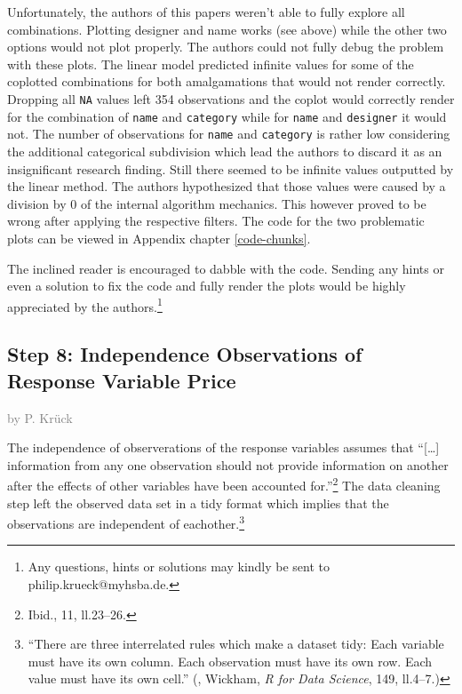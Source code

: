 \documentclass[a4paper, nobind]{templates/ociamthesis}
\begin{document}
Unfortunately, the authors of this papers weren't able to fully explore all combinations.
Plotting designer and name works (see above) while the other two options would not plot properly.
The authors could not fully debug the problem with these plots.
The linear model predicted infinite values for some of the coplotted combinations for both amalgamations that would not render correctly.
Dropping all \texttt{NA} values left 354 observations and the coplot would correctly render for the combination of \texttt{name} and \texttt{category} while for \texttt{name} and \texttt{designer} it would not. The number of observations for \texttt{name} and \texttt{category} is rather low considering the additional categorical subdivision which lead the authors to discard it as an insignificant research finding.
Still there seemed to be infinite values outputted by the linear method. The authors hypothesized that those values were caused by a division by 0 of the internal algorithm mechanics. This however proved to be wrong after applying the respective filters.
The code for the two problematic plots can be viewed in Appendix chapter \ref{code-chunks}.

The inclined reader is encouraged to dabble with the code. Sending any hints or even a solution to fix the code and fully render the plots would be highly appreciated by the authors.\footnote{Any questions, hints or solutions may kindly be sent to philip.krueck@myhsba.de.}

\hypertarget{step-8-independence-observations-of-response-variable-price}{%
\subsection{Step 8: Independence Observations of Response Variable Price}\label{step-8-independence-observations-of-response-variable-price}}

\textcolor{gray}{by P. Krück}

The independence of observerations of the response variables assumes that ``{[}\ldots{}{]} information from any one observation should not provide information on another after the effects of other variables have been accounted for.''\footnote{Ibid., 11, ll.23--26.}
The data cleaning step left the observed data set in a tidy format which implies that the observations are independent of eachother.\footnote{``There are three interrelated rules which make a dataset tidy: Each variable must have its own column. Each observation must have its own row. Each value must have its own cell.'' (, Wickham, \emph{R for Data Science}, 149, ll.4--7.)}
\end{document}
